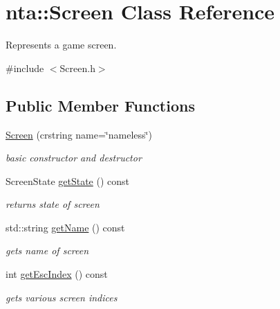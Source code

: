 \hypertarget{classnta_1_1Screen}{}\section{nta\+:\+:Screen Class Reference}
\label{classnta_1_1Screen}


Represents a game screen.  




{\ttfamily \#include $<$Screen.\+h$>$}

\subsection*{Public Member Functions}
\begin{DoxyCompactItemize}
\item 
\mbox{\label{classnta_1_1Screen_a268c9de735197debab91eb54f787fdea}} 
\hyperlink{classnta_1_1Screen_a268c9de735197debab91eb54f787fdea}{Screen} (crstring name=\char`\"{}nameless\char`\"{})
\begin{DoxyCompactList}\small\item\em basic constructor and destructor \end{DoxyCompactList}\item 
\mbox{\label{classnta_1_1Screen_a2d53fc8f7ac43307896863fd6b3cad1c}} 
Screen\+State \hyperlink{classnta_1_1Screen_a2d53fc8f7ac43307896863fd6b3cad1c}{get\+State} () const
\begin{DoxyCompactList}\small\item\em returns state of screen \end{DoxyCompactList}\item 
\mbox{\label{classnta_1_1Screen_a9b4fd8642c1cc76ed53d281391b4b542}} 
std\+::string \hyperlink{classnta_1_1Screen_a9b4fd8642c1cc76ed53d281391b4b542}{get\+Name} () const
\begin{DoxyCompactList}\small\item\em gets name of screen \end{DoxyCompactList}\item 
\mbox{\label{classnta_1_1Screen_a506f2266b008ccd071f630a5c252567e}} 
int \hyperlink{classnta_1_1Screen_a506f2266b008ccd071f630a5c252567e}{get\+Esc\+Index} () const
\begin{DoxyCompactList}\small\item\em gets various screen indices \end{DoxyCompactList}\item 

\end{DoxyCompactItemize}
